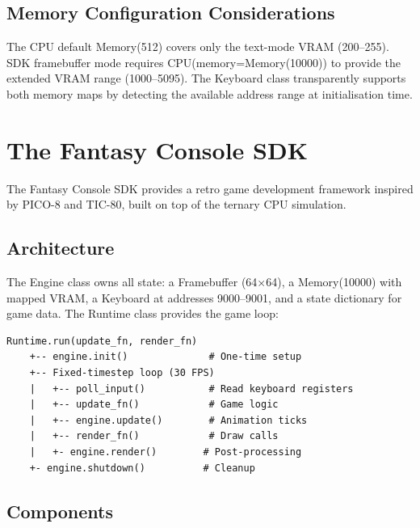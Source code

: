 \documentclass[12pt,a4paper,twoside]{book}
\theoremstyle{trinarytheorem}
\theoremstyle{trinarydefinition}
\newcommand{\code}[1]{\textsf{#1}}
\begin{document}
\section{Memory Configuration Considerations}

The CPU default \code{Memory(512)} covers only the text-mode VRAM (200--255).
SDK framebuffer mode requires \code{CPU(memory=Memory(10000))} to provide the
extended VRAM range (1000--5095). The \code{Keyboard} class transparently
supports both memory maps by detecting the available address range at
initialisation time.

\chapter{The Fantasy Console SDK}
\label{ch:sdk}

The Fantasy Console SDK provides a retro game development framework inspired by
PICO-8 and TIC-80, built on top of the ternary CPU simulation.

\section{Architecture}

The \code{Engine} class owns all state: a \code{Framebuffer} (64$\times$64), a
\code{Memory(10000)} with mapped VRAM, a \code{Keyboard} at addresses 9000--9001,
and a \code{state} dictionary for game data. The \code{Runtime} class provides the
game loop:

\begin{verbatim}
Runtime.run(update_fn, render_fn)
    +-- engine.init()              # One-time setup
    +-- Fixed-timestep loop (30 FPS)
    |   +-- poll_input()           # Read keyboard registers
    |   +-- update_fn()            # Game logic
    |   +-- engine.update()        # Animation ticks
    |   +-- render_fn()            # Draw calls
    |   +- engine.render()        # Post-processing
    +- engine.shutdown()          # Cleanup
\end{verbatim}

\section{Components}
\end{document}
